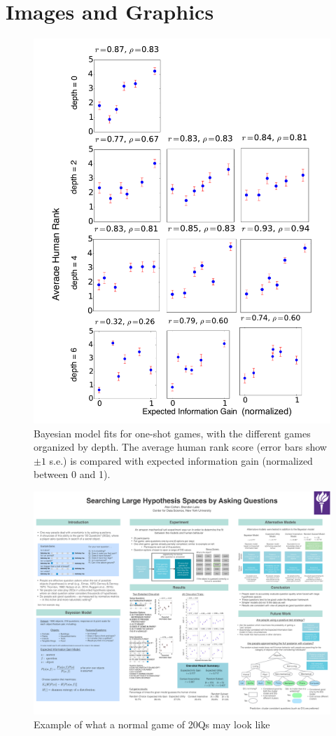 \documentclass[11pt,letterpaper]{article}
\begin{document}
\newpage
\section*{Images and Graphics}

\begin{figure}[h!]
\begin{center}
\includegraphics[width=0.7\linewidth]{all_scatterplots}
\end{center}
\caption{Bayesian model fits for one-shot games, with the different games organized by depth. The average human rank score (error bars show $\pm 1$ s.e.) is compared with expected information gain (normalized between 0 and 1).} 
\label{all-trials}
\end{figure}


\begin{figure}[h!]
\begin{center}
\includegraphics[width=1.0\linewidth]{game_example}
\end{center}
\caption{Example of what a normal game of 20Qs may look like} 
\label{game_example}
\end{figure}
\end{document}
